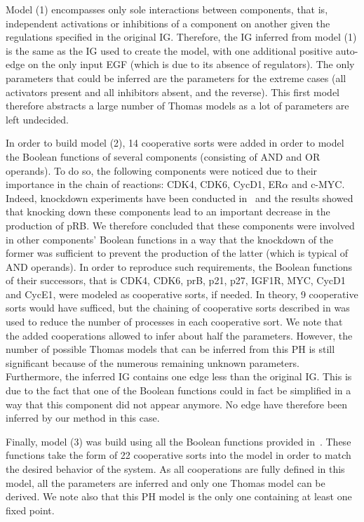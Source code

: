 Model (1) encompasses only sole interactions between components, that is,
independent activations or inhibitions of a component on another given the regulations specified in the original IG.
Therefore, the IG inferred from model (1) is the same as the IG used to create the model,
with one additional positive auto-edge on the only input EGF (which is due to its absence of regulators).
The only parameters that could be inferred are the parameters for the extreme cases
(all activators present and all inhibitors absent, and the reverse).
This first model therefore abstracts a large number of Thomas models as a lot of parameters are left undecided.

In order to build model (2), 14 cooperative sorts were added in order to model the Boolean functions of several components
(consisting of AND and OR operands).
To do so, the following components were noticed due to their importance in the chain of reactions:
CDK4, CDK6, CycD1, ER$\alpha$ and c-MYC.
Indeed, knockdown experiments have been conducted in~\cite{Sahin09}
and the results showed that knocking down these components lead to an important decrease in the production of pRB.
We therefore concluded that these components were involved in other components' Boolean functions
in a way that the knockdown of the former was sufficient to prevent the production of the latter (which is typical of AND operands).
In order to reproduce such requirements, the Boolean functions of their successors,
that is CDK4, CDK6, prB, p21, p27, IGF1R, MYC, CycD1 and CycE1,
were modeled as cooperative sorts, if needed.
In theory, 9 cooperative sorts would have sufficed, but the chaining of cooperative sorts described
in  was used to reduce the number of processes in each cooperative sort.
We note that the added cooperations allowed to infer about half the parameters.
However, the number of possible Thomas models that can be inferred from this PH is still significant
because of the numerous remaining unknown parameters.
Furthermore, the inferred IG contains one edge less than the original IG. This is due to the fact that
one of the Boolean functions could in fact be simplified in a way that this component did not appear anymore.
No edge have therefore been inferred by our method in this case.

Finally, model (3) was build using all the Boolean functions provided in~\cite{Sahin09}.
These functions take the form of 22 cooperative sorts into the model in order to match the desired behavior of the system.
As all cooperations are fully defined in this model, all the parameters are inferred and only one Thomas model can be derived.
We note also that this PH model is the only one containing at least one fixed point.



